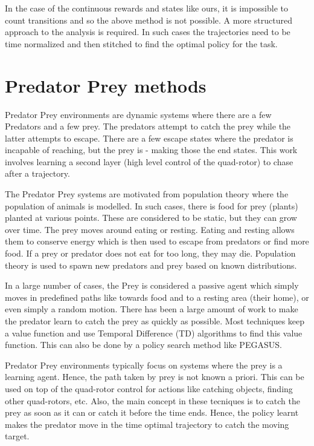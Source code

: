 \documentclass[hidelinks,BTech]{iitmdiss}
\begin{document}
In the case of the continuous rewards and states like ours, it is impossible to count transitions and so the above method is not possible. A more structured approach to the analysis is required. In such cases the trajectories need to be time normalized and then stitched to find the optimal policy for the task.

\section{Predator Prey methods}

Predator Prey environments are dynamic systems where there are a few Predators and a few prey. The predators attempt to catch the prey while the latter attempts to escape. There are a few escape states where the predator is incapable of reaching, but the prey is - making those the end states. This work involves learning a second layer (high level control of the quad-rotor) to chase after a trajectory.

The Predator Prey systems are motivated from population theory \cite{PredatorPreyCoEvolution} where the population of animals is modelled. In such cases, there is food for prey (plants) planted at various points. These are considered to be static, but they can grow over time. The prey moves around eating or resting. Eating and resting allows them to conserve energy which is then used to escape from predators or find more food. If a prey or predator does not eat for too long, they may die. Population theory is used to spawn new predators and prey based on known distributions.

In a large number of cases, the Prey is considered a passive agent which simply moves in predefined paths like towards food and to a resting area (their home), or even simply a random motion. There has been a large amount of work to make the predator learn to catch the prey as quickly as possible. Most techniques \cite{PredatorPrey} keep a value function and use Temporal Difference (TD) algorithms to find this value function. This can also be done by a policy search method like PEGASUS.

Predator Prey environments typically focus on systems where the prey is a learning agent. Hence, the path taken by prey is not known a priori. This can be used on top of the quad-rotor control for actions like catching objects, finding other quad-rotors, etc. Also, the main concept in these tecniques is to catch the prey as soon as it can or catch it before the time ends. Hence, the policy learnt makes the predator move in the time optimal trajectory to catch the moving target.
\end{document}
